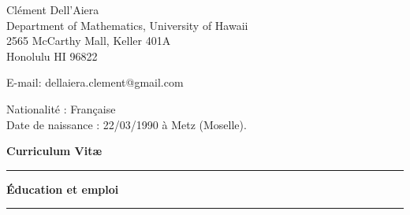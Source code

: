 \documentclass[a4paper,11pt]{article}
\newcommand{\titre}[1]{%
	\begin{center}
	\bigskip
	\rule{\textwidth}{1pt}
	\par\vspace{0.1cm}
        \textbf{\large #1}
	\par\rule{\textwidth}{1pt}
	\end{center}
	\bigskip
	}
\begin{document}
\begin{flushleft}
Clément Dell'Aiera \\
Department of Mathematics, University of Hawaii\\
2565 McCarthy Mall, Keller 401A \\
Honolulu HI 96822 \\

\medskip

E-mail: dellaiera.clement@gmail.com


\end{flushleft}
\begin{flushleft}
Nationalit\'e : Fran\c{c}aise \\
Date de naissance : 22/03/1990 \`{a} Metz (Moselle).
\end{flushleft}

\vspace{1.5cm}
\begin{center}
\par\huge{\textbf{Curriculum Vit\ae} }
\end{center}

\titre{\'{E}ducation et emploi}
\end{document}
